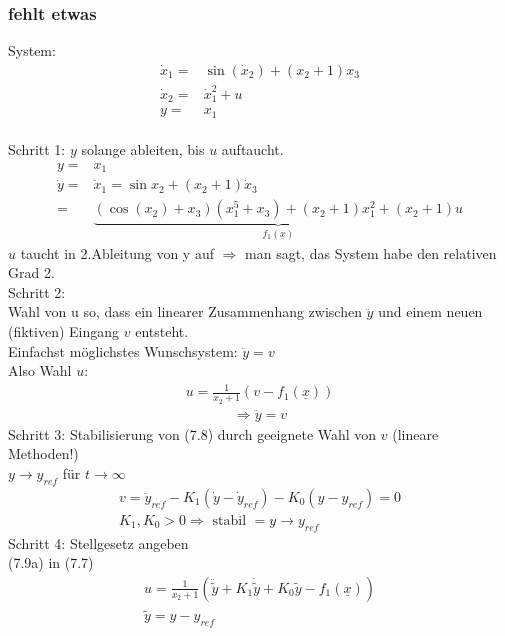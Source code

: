 \documentclass[11pt,a4paper]{article}
\begin{document}
\subsubsection{fehlt etwas}
System: \\
\begin{align*}
\dot x_1 =&\sin{(\dot x_2)} + (x_2 + 1)x_3\\
\dot x_2 =&\dot x_1^2 + u \tag{7.5}\\
y =& x_1
\end{align*}\\
Schritt 1: $y$ solange ableiten, bis $u$ auftaucht.
\begin{align*}
y=&x_1\\
\dot y =& \dot x_1  = \sin{x_2} + (x_2 + 1)\dot x_3\\
=&\underbrace{(\cos(x_2) + x_3)(x_1^5 + x_3) + (x_2 + 1)x_1^2 + (x_2 + 1)u}_{f_1(\underline x)}\tag{7.6}
\end{align*}
$u $ taucht in 2.Ableitung von y auf $\Rightarrow$ man sagt, das System habe den relativen Grad 2.\\
Schritt 2:\\
Wahl von u so, dass ein linearer Zusammenhang zwischen $\ddot y$ und einem neuen (fiktiven) Eingang $v$ entsteht.\\
Einfachst möglichstes Wunschsystem: $\ddot y = v$\\
Also Wahl $u$: \begin{align*}u = \frac{1}{x_2 + 1} (v - f_1(\underline x)) \tag{7.7}\end{align*}
\begin{align*}\Rightarrow \ddot y = v \tag{7.8}\end{align*}
Schritt 3: Stabilisierung von (7.8) durch geeignete Wahl von $v$ (lineare Methoden!)\\
$y \to y_{ref}$ für $t\to \infty$\\
\begin{align*}v= \ddot y_{ref} - K_1(\dot y - \dot y_{ref} ) - K_0(y-y_{ref}) = 0 \tag{7.9b}\\
K_1, K_0 > 0 \Rightarrow \text{ stabil } = y\to y_{ref}
\end{align*}
Schritt 4: Stellgesetz angeben\\
(7.9a) in (7.7)\\
\begin{align*}
u = \frac{1}{x_2 + 1}(\ddot{\tilde y} + K_1 \dot{\tilde y} + K_0 \tilde y - f_1(\underline x)  )\tag{7.10}\\
\tilde y = y- y_{ref}
\end{align*}
\end{document}
